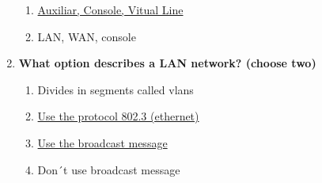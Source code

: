 \documentclass{article}
\begin{document}
\begin{enumerate}[label=\textbf{\arabic*.}]
\begin{enumerate}[label=\textbf{\Alph*.}]
      \item \underline{Auxiliar, Console, Vitual Line}
      \item LAN, WAN, console
    \end{enumerate}
  \item \textbf{What option describes a LAN network? (choose two)}
    \begin{enumerate}[label=\textbf{\Alph*.}]
      \item Divides in segments called vlans
      \item \underline{Use the protocol 802.3 (ethernet)}
      \item \underline{Use the broadcast message}
      \item Don´t use broadcast message
    \end{enumerate}
\end{enumerate}
\end{document}
